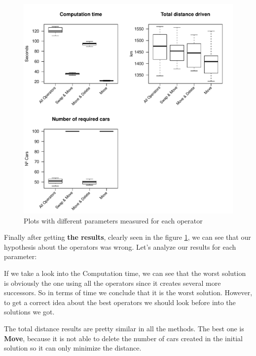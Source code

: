 \documentclass[12]{article}
\begin{document}
\begin{figure}[H]
\centering
\includegraphics[width=\textwidth,height=\textheight, keepaspectratio]{Results/data_1.pdf}
\caption{Plots with different parameters measured for each operator }
\label{operators}
\end{figure}
\vspace{1cm}

Finally after getting \textbf{the results}, clearly seen in the figure \ref{operators}, we can see that our hypothesis about the operators was wrong. Let's analyze our results for each parameter: 
\\
\smallskip

If we take a look into the Computation time, we can see that the worst solution is obviously the one using all the operators since it creates several more successors. So in terms of time we conclude that it is the worst solution. However, to get a correct idea about the best operators we should look before into the solutions we got. 
\\
\smallskip

The total distance results are pretty similar in all the methods. The best one is \textbf{Move}, because it is not able to delete the number of cars created in the initial solution so it can only minimize the distance.  
\\
\smallskip
\end{document}

